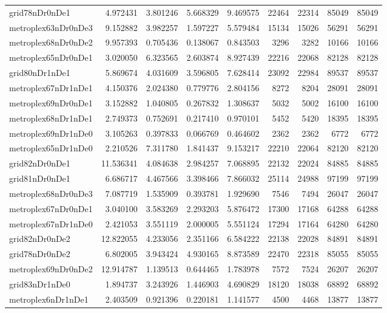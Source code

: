 \begin{longtable}{|l|r|r|r|r|r|r|r|r|}
grid78nDr0nDe1 & 4.972431 & 3.801246 & 5.668329 & 9.469575 & 22464 & 22314 & 85049 & 85049 \\
metroplex63nDr0nDe3 & 9.152882 & 3.982257 & 1.597227 & 5.579484 & 15134 & 15026 & 56291 & 56291 \\
metroplex68nDr0nDe2 & 9.957393 & 0.705436 & 0.138067 & 0.843503 & 3296 & 3282 & 10166 & 10166 \\
metroplex65nDr0nDe1 & 3.020050 & 6.323565 & 2.603874 & 8.927439 & 22216 & 22068 & 82128 & 82128 \\
grid80nDr1nDe1 & 5.869674 & 4.031609 & 3.596805 & 7.628414 & 23092 & 22984 & 89537 & 89537 \\
metroplex67nDr1nDe1 & 4.150376 & 2.024380 & 0.779776 & 2.804156 & 8272 & 8204 & 28091 & 28091 \\
metroplex69nDr0nDe1 & 3.152882 & 1.040805 & 0.267832 & 1.308637 & 5032 & 5002 & 16100 & 16100 \\
metroplex68nDr1nDe1 & 2.749373 & 0.752691 & 0.217410 & 0.970101 & 5452 & 5420 & 18395 & 18395 \\
metroplex69nDr1nDe0 & 3.105263 & 0.397833 & 0.066769 & 0.464602 & 2362 & 2362 & 6772 & 6772 \\
metroplex65nDr1nDe0 & 2.210526 & 7.311780 & 1.841437 & 9.153217 & 22210 & 22064 & 82120 & 82120 \\
grid82nDr0nDe1 & 11.536341 & 4.084638 & 2.984257 & 7.068895 & 22132 & 22024 & 84885 & 84885 \\
grid81nDr0nDe1 & 6.686717 & 4.467566 & 3.398466 & 7.866032 & 25114 & 24988 & 97199 & 97199 \\
metroplex68nDr0nDe3 & 7.087719 & 1.535909 & 0.393781 & 1.929690 & 7546 & 7494 & 26047 & 26047 \\
metroplex67nDr0nDe1 & 3.040100 & 3.583269 & 2.293203 & 5.876472 & 17300 & 17168 & 64288 & 64288 \\
metroplex67nDr1nDe0 & 2.421053 & 3.551119 & 2.000005 & 5.551124 & 17294 & 17164 & 64280 & 64280 \\
grid82nDr0nDe2 & 12.822055 & 4.233056 & 2.351166 & 6.584222 & 22138 & 22028 & 84891 & 84891 \\
grid78nDr0nDe2 & 6.802005 & 3.943424 & 4.930165 & 8.873589 & 22470 & 22318 & 85055 & 85055 \\
metroplex69nDr0nDe2 & 12.914787 & 1.139513 & 0.644465 & 1.783978 & 7572 & 7524 & 26207 & 26207 \\
grid83nDr1nDe0 & 1.894737 & 3.243926 & 1.446903 & 4.690829 & 18120 & 18038 & 68892 & 68892 \\
metroplex6nDr1nDe1 & 2.403509 & 0.921396 & 0.220181 & 1.141577 & 4500 & 4468 & 13877 & 13877 \\

\end{longtable}
